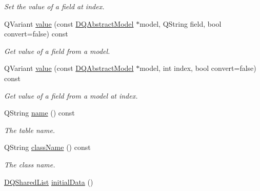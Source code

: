 \begin{DoxyCompactItemize}
\begin{DoxyCompactList}\small\item\em Set the value of a field at index. \item\end{DoxyCompactList}\item 
QVariant \hyperlink{classDQModelMetaInfo_a719f2a839b636880494fc86bfd920563}{value} (const \hyperlink{classDQAbstractModel}{DQAbstractModel} $\ast$model, QString field, bool convert=false) const 
\begin{DoxyCompactList}\small\item\em Get value of a field from a model. \item\end{DoxyCompactList}\item 
QVariant \hyperlink{classDQModelMetaInfo_a71421a167107f32b9a3b6f647a978a1d}{value} (const \hyperlink{classDQAbstractModel}{DQAbstractModel} $\ast$model, int index, bool convert=false) const 
\begin{DoxyCompactList}\small\item\em Get value of a field from a model at index. \item\end{DoxyCompactList}\item 
\hypertarget{classDQModelMetaInfo_acc4a5bd42ac907a92874c73834d4eb51}{
QString \hyperlink{classDQModelMetaInfo_acc4a5bd42ac907a92874c73834d4eb51}{name} () const }
\label{classDQModelMetaInfo_acc4a5bd42ac907a92874c73834d4eb51}

\begin{DoxyCompactList}\small\item\em The table name. \item\end{DoxyCompactList}\item 
\hypertarget{classDQModelMetaInfo_a59584abd849f07fe88d97cca0532997e}{
QString \hyperlink{classDQModelMetaInfo_a59584abd849f07fe88d97cca0532997e}{className} () const }
\label{classDQModelMetaInfo_a59584abd849f07fe88d97cca0532997e}

\begin{DoxyCompactList}\small\item\em The class name. \item\end{DoxyCompactList}\item 
\hypertarget{classDQModelMetaInfo_af3c07bca76f7de40a5240ecaff1386b8}{
\hyperlink{classDQSharedList}{DQSharedList} \hyperlink{classDQModelMetaInfo_af3c07bca76f7de40a5240ecaff1386b8}{initialData} ()}
\label{classDQModelMetaInfo_af3c07bca76f7de40a5240ecaff1386b8}


\end{DoxyCompactItemize}
